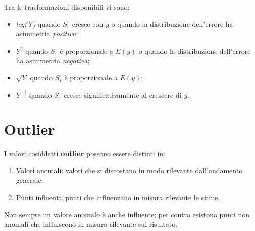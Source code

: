 \documentclass[a4page, 11pt]{article} %
\begin{document}
Tra le trasformazioni disponibili vi sono:

\begin{itemize}
\item \textit{log(Y)} quando $S_\varepsilon$ cresce con $y$ o quando la distribuzione dell'errore ha asimmetria \textit{positiva};
\item \textit{$Y^2$} quando $S_\varepsilon$ è proporzionale a $E(y)$ o quando la distribuzione dell'errore ha asimmetria \textit{negativa};
\item \textit{$\sqrt{Y}$} quando $S_\varepsilon$ è proporzionale a $E(y)$;
\item \textit{$Y^{-1}$} quando $S_\varepsilon$ cresce significativamente al crescere di $y$.
\end{itemize}

\section{Outlier}
I valori cosiddetti \textbf{outlier} possono essere distinti in:
\begin{enumerate}[noitemsep]
\item Valori anomali: valori che si discostano in modo rilevante dall’andamento generale.
\item Punti influenti: punti che influenzano in misura rilevante le stime.
\end{enumerate}
Non sempre un valore anomalo è anche influente; per contro esistono punti non anomali che influiscono in misura rilevante sul risultato.
\end{document}
